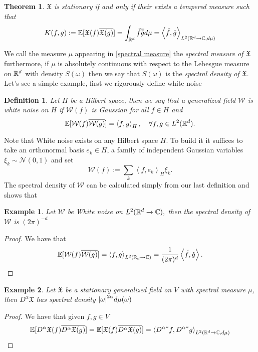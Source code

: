\documentclass[12pt]{article}
\newtheorem{theorem}{Theorem}
\newtheorem{definition}{Definition}
\newtheorem{example}{Example}
\newcommand{\Ww}{\mathcal{W}}\newcommand{\Aa}{\mathcal{A}}\newcommand{\Bb}{\mathcal{B}}\newcommand{\Cc}{\mathcal{C}}\newcommand{\Ee}{\mathcal{E}}\newcommand{\Ff}{\mathcal{F}}\newcommand{\Gg}{\mathcal{G}}\newcommand{\Hh}{\mathcal{H}}\newcommand{\Kk}{\mathcal{K}}\newcommand{\Ll}{\mathcal{L}}\newcommand{\Mm}{\mathcal{M}}\newcommand{\Nn}{\mathcal{N}}\newcommand{\Pp}{\mathcal{P}}\newcommand{\Qq}{\mathcal{Q}}\newcommand{\Rr}{{\mathcal R}}\newcommand{\Ss}{{\mathcal S}}\newcommand{\Tt}{{\mathcal T}}\newcommand{\Zz}{{\mathcal Z}}\newcommand{\Uu}{{\mathcal U}}
\newcommand{\W}{{\mathcal W}}
\newcommand{\br}[1]{\left\langle#1\right\rangle}
\begin{document}
\begin{CJK*}{UTF8}{gbsn}
\begin{theorem}
		$\mathfrak{X} $ is stationary if and only if their exists a tempered measure such that
		\begin{equation}\label{spectral measure}
			K(f,g):=\E[\mathfrak{X} (f)\overline{\mathfrak{X} (g)}]=\int_{\R^d}\check{f}\overline{\check{g}}d \mu=\br{\check{f},\check{g}}_{L^2(\R^d\to\C,d\mu )}
		\end{equation}
	\end{theorem}
	We call the measure $\mu $ appearing in \eqref{spectral measure} the \emph{spectral measure of $\mathfrak{X}$} furthermore, if $\mu $ is absolutely continuous with respect to the Lebesgue measure on ${\mathbb R}^d$
	with density $S(\omega)$ then we say that $S(\omega)$ is the \emph{spectral density of $\mathfrak{X}$}. Let's see a simple example, first we rigorously define white noise
	\begin{definition}
		Let $H$ be a Hilbert space, then we say that a generalized field  $\Ww$ is \emph{white noise on $H$} if  $\W(f)$ is Gaussian for all $f \in H$ and
		\begin{equation*}
			\E[\W(f)\overline{\W(g)}]=\br{f,g}_{H}, \quad\forall f,g \in L^2(\R^d).
		\end{equation*}
	\end{definition}
	Note that White noise exists on any Hilbert space $H$. To build it it suffices to take an orthonormal basis  $e_k \in H$, a family of independent Gaussian variables $\xi _k \sim \Nn(0,1)$ and set
	\begin{equation*}
		\W(f):=\sum_{k}\br{f,e_k}_H \xi _k .
	\end{equation*}
	The spectral density of $\Ww$ can be calculated simply from our last definition and shows that
	\begin{example}
		Let $\Ww$ be White noise on $L^2({\mathbb R}^d\to\mathbb{C}),$ then the spectral density of $\Ww$ is $(2\pi )^{-d}$
	\end{example}
	\begin{proof}
		We have that
		\begin{equation*}
			\E[\Ww(f)\overline{\Ww(g)}]=\br{f,g}_{L^2(\R_d\to\C)}=\frac{1}{(2\pi )^d}\br{\check{f},\check{g}}.
		\end{equation*}
	\end{proof}
	\begin{example}
		Let $\mathfrak{X}$ be a stationary generalized field on $V$ with spectral measure $\mu $, then $D^\alpha \mathfrak{X}$ has spectral density $\abs{\omega}^{2\alpha}d\mu(\omega) $
	\end{example}
	\begin{proof}
		We have that given $f,g \in V$
		\begin{equation*}
			\E[D^\alpha\mathfrak{X}(f)\overline{D^\alpha\mathfrak{X}(g)}]=\E[\mathfrak{X}(f)\overline{D^\alpha\mathfrak{X}(g)}]=\br{{D^\alpha}^*f,{D^\alpha}^*g}_{L^2(\R^d\to\C,d\mu )}
		\end{equation*}


\end{proof}
\end{CJK*}
\end{document}

